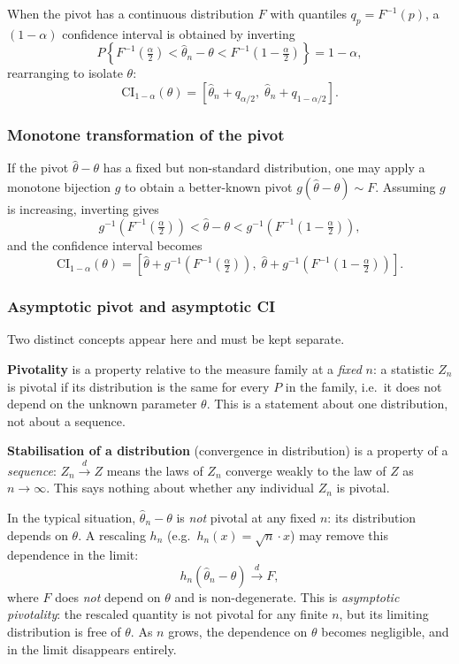 \documentclass[a4paper,oneside,12pt]{extarticle}
\theoremstyle{plain}
\theoremstyle{definition}
\theoremstyle{remark}
\begin{document}
When the pivot has a continuous distribution $F$ with quantiles
$q_p = F^{-1}(p)$, a $(1-\alpha)$ confidence interval is obtained by
inverting
\[
  P\!\left\{F^{-1}\!\left(\tfrac{\alpha}{2}\right)
    < \hat\theta_n - \theta
    < F^{-1}\!\left(1-\tfrac{\alpha}{2}\right)\right\} = 1-\alpha,
\]
rearranging to isolate $\theta$:
\[
  \mathrm{CI}_{1-\alpha}(\theta)
  = \left[\hat\theta_n + q_{\alpha/2},\;
          \hat\theta_n + q_{1-\alpha/2}\right].
\]

\subsubsection{Monotone transformation of the pivot}

If the pivot $\hat\theta - \theta$ has a fixed but non-standard
distribution, one may apply a monotone bijection $g$ to obtain a
better-known pivot $g(\hat\theta - \theta) \sim F$.  Assuming $g$ is
increasing, inverting gives
\[
  g^{-1}\!\left(F^{-1}\!\left(\tfrac{\alpha}{2}\right)\right)
  < \hat\theta - \theta
  < g^{-1}\!\left(F^{-1}\!\left(1-\tfrac{\alpha}{2}\right)\right),
\]
and the confidence interval becomes
\[
  \mathrm{CI}_{1-\alpha}(\theta)
  = \left[\hat\theta + g^{-1}\!\left(F^{-1}\!\left(\tfrac{\alpha}{2}\right)\right),\;
          \hat\theta + g^{-1}\!\left(F^{-1}\!\left(1-\tfrac{\alpha}{2}\right)\right)
    \right].
\]

\subsubsection{Asymptotic pivot and asymptotic CI}

Two distinct concepts appear here and must be kept separate.

\textbf{Pivotality} is a property relative to the measure family at
a \emph{fixed} $n$: a statistic $Z_n$ is pivotal if its distribution
is the same for every $P$ in the family, i.e.\ it does not depend on
the unknown parameter $\theta$.  This is a statement about one
distribution, not about a sequence.

\textbf{Stabilisation of a distribution} (convergence in
distribution) is a property of a \emph{sequence}: $Z_n \xrightarrow{d} Z$
means the laws of $Z_n$ converge weakly to the law of $Z$ as
$n\to\infty$.  This says nothing about whether any individual $Z_n$
is pivotal.

In the typical situation, $\hat\theta_n - \theta$ is \emph{not}
pivotal at any fixed $n$: its distribution depends on $\theta$.
A rescaling $h_n$ (e.g.\ $h_n(x) = \sqrt{n}\cdot x$) may remove
this dependence in the limit:
\[
  h_n(\hat\theta_n - \theta) \xrightarrow{d} F,
\]
where $F$ does \emph{not} depend on $\theta$ and is non-degenerate.
This is \emph{asymptotic pivotality}: the rescaled quantity is not
pivotal for any finite $n$, but its limiting distribution is free of
$\theta$.  As $n$ grows, the dependence on $\theta$ becomes
negligible, and in the limit disappears entirely.
\end{document}
